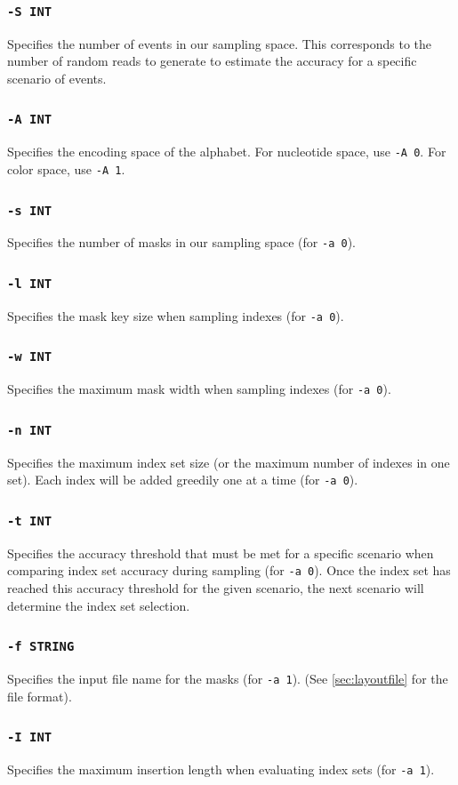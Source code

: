 \documentclass[a4paper,12pt]{book}
\newcommand{\TT}[1]{{\tt #1}} %
\begin{document}
\subsubsection{\TT{-S INT}}
Specifies the number of events in our sampling space.
This corresponds to the number of random reads to generate to estimate the accuracy for a specific scenario of events.
\subsubsection{\TT{-A INT}}
Specifies the encoding space of the alphabet.
For nucleotide space, use \TT{-A 0}.
For color space, use \TT{-A 1}.
\subsubsection{\TT{-s INT}}
Specifies the number of masks in our sampling space (for \TT{-a 0}).
\subsubsection{\TT{-l INT}}
Specifies the mask key size when sampling indexes (for \TT{-a 0}).
\subsubsection{\TT{-w INT}}
Specifies the maximum mask width when sampling indexes (for \TT{-a 0}).
\subsubsection{\TT{-n INT}}
Specifies the maximum index set size (or the maximum number of indexes in one set).
Each index will be added greedily one at a time (for \TT{-a 0}).
\subsubsection{\TT{-t INT}}
Specifies the accuracy threshold that must be met for a specific scenario when comparing index set accuracy during sampling (for \TT{-a 0}).
Once the index set has reached this accuracy threshold for the given scenario, the next scenario will determine the index set selection.
\subsubsection{\TT{-f STRING}}
Specifies the input file name for the masks (for \TT{-a 1}).
(See \autoref{sec:layoutfile} for the file format).
\subsubsection{\TT{-I INT}}
Specifies the maximum insertion length when evaluating index sets (for \TT{-a 1}).
\end{document}
